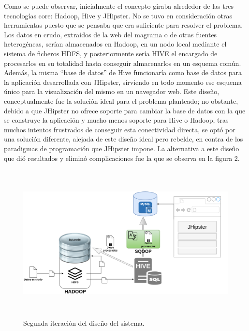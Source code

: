 Como se puede observar, inicialmente el concepto giraba alrededor de las tres tecnologías core: Hadoop, Hive y JHipster. No se tuvo en consideración otras herramientas puesto que se pensaba que era suficiente para resolver el problema. Los datos en crudo, extraídos de la web del magrama o de otras fuentes heterogéneas, serían almacenados en Hadoop, en un nodo local mediante el sistema de ficheros HDFS, y posteriormente sería HIVE el encargado de procesarlos en su totalidad hasta conseguir almacenarlos en un esquema común. Además, la misma “base de datos” de Hive funcionaría como base de datos para la aplicación desarrollada con JHipster, sirviendo en todo momento ese esquema único para la visualización del mismo en un navegador web. Este diseño, conceptualmente fue la solución ideal para el problema planteado; no obstante, debido a que JHipster no ofrece soporte para cambiar la base de datos con la que se construye la aplicación y mucho menos soporte para Hive o Hadoop, tras muchos intentos frustrados de conseguir esta conectividad directa, se optó por una solución diferente, alejada de este diseño ideal pero rebelde, en contra de los paradigmas de programación que JHipster impone. La alternativa a este diseño que dió resultados y eliminó complicaciones fue la que se observa en la figura 2. \par


\begin{figure}[H]
    \centering
    \includegraphics[width=1\textwidth,height=8cm]{Imagenes/Dis_Fig_2}
    \caption{Segunda iteración del diseño del sistema.}
    \label{fig:dis_2_sist}
\end{figure}
\par


